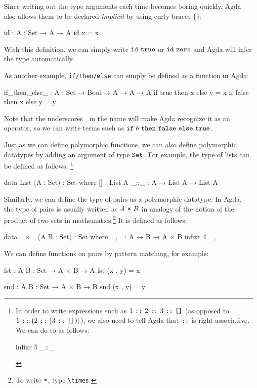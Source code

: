 \documentclass[a4paper,UKenglish]{tufte-handout}
\theoremstyle{definition}
\newcommand\prim[1]{{\AgdaPrimitive{#1}}}
\newcommand\ty[1]{{{\prim{Set}}_{#1}}}
\newcommand\fun[1]{{\AgdaFunction{#1}}}
\newcommand\data[1]{{\AgdaFunction{#1}}}
\newcommand\con[1]{{\AgdaInductiveConstructor{#1}}}
\newcommand\zero{\con{zero}}
\newcommand\true{\con{true}}
\newcommand\false{\con{false}}
\newcommand\nil{\con{[]}}
\newcommand\cons{\con{::}}
\renewcommand\prod{\data{×}}
\begin{document}
Since writing out the type arguments each time becomes boring quickly,
Agda also allows them to be declared \emph{implicit} by using curly
braces $\{\}$:
\begin{code}[number]
id : {A : Set} → A → A
id x = x
\end{code}
With this definition, we can simply write $\fun{id}\ \true$ or
$\fun{id}\ \zero$ and Agda will infer the type automatically.

As another example, \texttt{if/then/else} can simply be defined as a
function in Agda:

\begin{code}[number]
if_then_else_ : {A : Set} → Bool → A → A → A
if true   then x  else y  = x
if false  then x  else y  = y
\end{code}
Note that the underscores $\_$ in the name will make Agda recognize it
as an operator, so we can write terms such as
$\fun{if}\ b\ \allowbreak\fun{then}\ \false\ \allowbreak\fun{else}\ \true$.


Just as we can define polymorphic functions, we can also define
polymorphic datatypes by adding an argument of type $\ty{}$. For
example, the type of lists can be defined as follows:%
\footnote[][-1.5cm]{In order to write expressions such as
$1\ \cons\ 2\ \cons\ 3\ \cons\ \nil$ (as opposed to
$1\ \cons\ (2\ \cons\ (3\ \cons\ \nil))$), we also need to tell Agda
that $\cons$ is right associative. We can do so as follows:
\begin{code}
infixr 5 _::_
\end{code}
}

\begin{code}[number]
data List (A : Set) : Set where
  []    : List A
  _::_  : A → List A → List A
\end{code}
Similarly, we can define the type of pairs as a polymorphic
datatype. In Agda, the type of pairs is usually written as $A\ \prod\
B$ in analogy of the notion of the product of two sets in
mathematics.\footnote{To write $\prod$, type
\texttt{\textbackslash{}times}.} It is defined as follows:
\begin{code}[number]
data _×_ (A B : Set) : Set where
  _,_ : A → B → A × B
infixr 4 _,_
\end{code}
We can define functions on pairs by pattern matching, for example:
\begin{code}[number]
fst : {A B : Set} → A × B → A
fst (x , y) = x

snd : {A B : Set} → A × B → B
snd (x , y) = y
\end{code}
\end{document}

